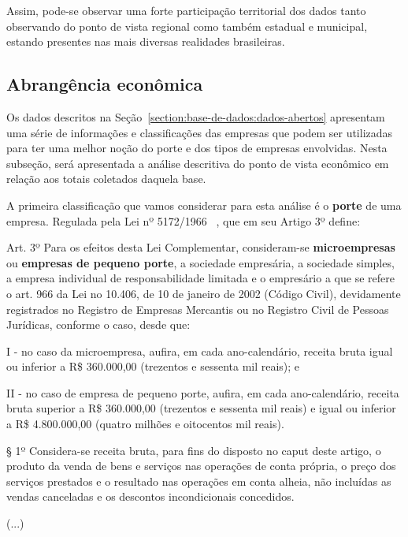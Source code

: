 Assim, pode-se observar uma forte participação territorial dos dados tanto observando do ponto de vista regional como também estadual e municipal, estando presentes nas mais diversas realidades brasileiras.

\subsection{Abrangência econômica}
\label{section:base-de-dados:analise-descritiva:abrangencia-economica}

Os dados descritos na Seção~\ref{section:base-de-dados:dados-abertos} apresentam uma série de informações e classificações das empresas que podem ser utilizadas para ter uma melhor noção do porte e dos tipos de empresas envolvidas. Nesta subseção, será apresentada a análise descritiva do ponto de vista econômico em relação aos totais coletados daquela base.

A primeira classificação que vamos considerar para esta análise é o \textbf{porte} de uma empresa. Regulada pela Lei nº 5172/1966 ~\cite{lei:5172:codigo-tributario}, que em seu Artigo 3º define:

\begin{citacao}
Art. 3º Para os efeitos desta Lei Complementar, consideram-se \textbf{microempresas} ou \textbf{empresas de pequeno porte}, a sociedade empresária, a sociedade simples, a empresa individual de responsabilidade limitada e o empresário a que se refere o art. 966 da Lei no 10.406, de 10 de janeiro de 2002 (Código Civil), devidamente registrados no Registro de Empresas Mercantis ou no Registro Civil de Pessoas Jurídicas, conforme o caso, desde que:

I - no caso da microempresa, aufira, em cada ano-calendário, receita bruta igual ou inferior a R\$ 360.000,00 (trezentos e sessenta mil reais); e

II - no caso de empresa de pequeno porte, aufira, em cada ano-calendário, receita bruta superior a R\$ 360.000,00 (trezentos e sessenta mil reais) e igual ou inferior a R\$ 4.800.000,00 (quatro milhões e oitocentos mil reais).

§ 1º  Considera-se receita bruta, para fins do disposto no caput deste artigo, o produto da venda de bens e serviços nas operações de conta própria, o preço dos serviços prestados e o resultado nas operações em conta alheia, não incluídas as vendas canceladas e os descontos incondicionais concedidos.

(...)
\end{citacao}

